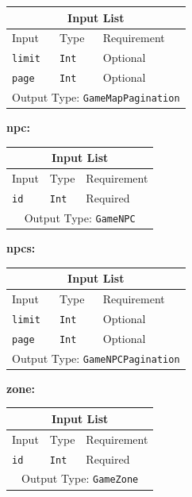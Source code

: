 \documentclass[10pt, a4paper]{memoir}
\numberwithin{equation}{section}
\theoremstyle{plain}
\theoremstyle{defp}
\theoremstyle{dotless}
\theoremstyle{definition}
\theoremstyle{dotless}
\theoremstyle{dotless}
\theoremstyle{defp}
\theoremstyle{defp}
\theoremstyle{be}          %
\theoremstyle{defp}
\newcommand\ttt[1]{\texttt{#1}}
\begin{document}
\begin{table}[h!]
	\centering
	\begin{tabular}{ |p{4.2cm}|p{6cm}|p{3cm}|  }
		\hline
		\multicolumn{3}{|c|}{Input List} \\
		\hline
		Input & Type & Requirement\\
		\hline
		\ttt{limit} & \ttt{Int} & Optional\\
		\ttt{page} & \ttt{Int} & Optional\\
		\hline
		\multicolumn{3}{|c|}{Output Type: \ttt{GameMapPagination}} \\
		\hline
	\end{tabular}
\end{table}

\medskip

\textbf{npc:}

\begin{table}[h!]
	\centering
	\begin{tabular}{ |p{4.2cm}|p{6cm}|p{3cm}|  }
		\hline
		\multicolumn{3}{|c|}{Input List} \\
		\hline
		Input & Type & Requirement\\
		\hline
		\ttt{id} & \ttt{Int} & Required\\
		\hline
		\multicolumn{3}{|c|}{Output Type: \ttt{GameNPC}} \\
		\hline
	\end{tabular}
\end{table}

\medskip

\textbf{npcs:}

\begin{table}[h!]
	\centering
	\begin{tabular}{ |p{4.2cm}|p{6cm}|p{3cm}|  }
		\hline
		\multicolumn{3}{|c|}{Input List} \\
		\hline
		Input & Type & Requirement\\
		\hline
		\ttt{limit} & \ttt{Int} & Optional\\
		\ttt{page} & \ttt{Int} & Optional\\
		\hline
		\multicolumn{3}{|c|}{Output Type: \ttt{GameNPCPagination}} \\
		\hline
	\end{tabular}
\end{table}

\medskip

\textbf{zone:}

\begin{table}[h!]
	\centering
	\begin{tabular}{ |p{4.2cm}|p{6cm}|p{3cm}|  }
		\hline
		\multicolumn{3}{|c|}{Input List} \\
		\hline
		Input & Type & Requirement\\
		\hline
		\ttt{id} & \ttt{Int} & Required\\
		\hline
		\multicolumn{3}{|c|}{Output Type: \ttt{GameZone}} \\
		\hline
	\end{tabular}
\end{table}
\end{document}
